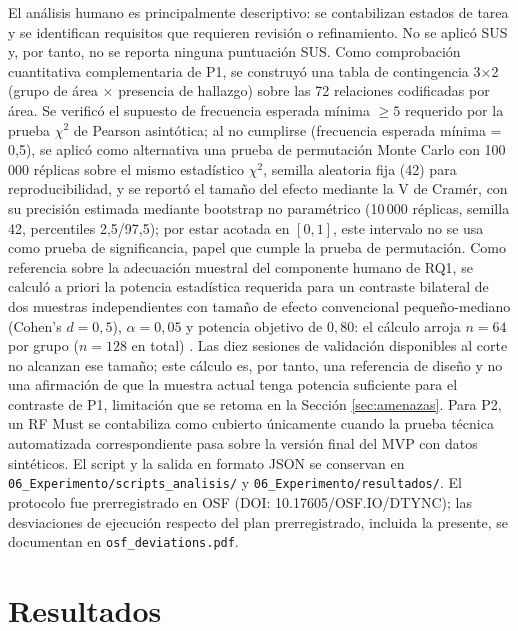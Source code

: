\documentclass[runningheads]{llncs}
\begin{document}
	El análisis humano es principalmente descriptivo: se contabilizan estados de tarea y se identifican requisitos que requieren revisión o refinamiento. No se aplicó SUS y, por tanto, no se reporta ninguna puntuación SUS. Como comprobación cuantitativa complementaria de P1, se construyó una tabla de contingencia 3$\times$2 (grupo de área $\times$ presencia de hallazgo) sobre las 72 relaciones codificadas por área. Se verificó el supuesto de frecuencia esperada mínima $\geq 5$ requerido por la prueba $\chi^2$ de Pearson asintótica; al no cumplirse (frecuencia esperada mínima = 0,5), se aplicó como alternativa una prueba de permutación Monte Carlo con 100\,000 réplicas sobre el mismo estadístico $\chi^2$, semilla aleatoria fija (42) para reproducibilidad, y se reportó el tamaño del efecto mediante la V de Cramér, con su precisión estimada mediante bootstrap no paramétrico (10\,000 réplicas, semilla 42, percentiles 2,5/97,5); por estar acotada en $[0,1]$, este intervalo no se usa como prueba de significancia, papel que cumple la prueba de permutación.
	Como referencia sobre la adecuación muestral del componente humano de RQ1, se calculó a priori la potencia estadística requerida para un contraste bilateral de dos muestras independientes con tamaño de efecto convencional pequeño-mediano (Cohen's $d=0{,}5$), $\alpha=0{,}05$ y potencia objetivo de $0{,}80$: el cálculo arroja $n=64$ por grupo ($n=128$ en total) \cite{faul2007}. Las diez sesiones de validación disponibles al corte no alcanzan ese tamaño; este cálculo es, por tanto, una referencia de diseño y no una afirmación de que la muestra actual tenga potencia suficiente para el contraste de P1, limitación que se retoma en la Sección \ref{sec:amenazas}.
	Para P2, un RF Must se contabiliza como cubierto únicamente cuando la prueba técnica automatizada correspondiente pasa sobre la versión final del MVP con datos sintéticos. El script y la salida en formato JSON se conservan en \texttt{06\_Experimento/scripts\_analisis/} y \texttt{06\_Experimento/resultados/}. El protocolo fue prerregistrado en OSF (DOI: 10.17605/OSF.IO/DTYNC); las desviaciones de ejecución respecto del plan prerregistrado, incluida la presente, se documentan en \texttt{osf\_deviations.pdf}.
	
	\section{Resultados}
\end{document}
